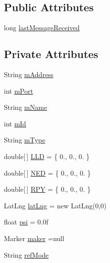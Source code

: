 \subsection*{Public Attributes}
\begin{DoxyCompactItemize}
\item 
long \hyperlink{classpt_1_1lsts_1_1asa_1_1sys_1_1Sys_ac6b2954f1dadd92dd574ae9c6af2a2e5}{last\+Message\+Received}
\end{DoxyCompactItemize}
\subsection*{Private Attributes}
\begin{DoxyCompactItemize}
\item 
String \hyperlink{classpt_1_1lsts_1_1asa_1_1sys_1_1Sys_adc306cc2f9bdf3006383c7612c5125c6}{m\+Address}
\item 
int \hyperlink{classpt_1_1lsts_1_1asa_1_1sys_1_1Sys_a35506036a8dbc58d09d0eea04e425698}{m\+Port}
\item 
String \hyperlink{classpt_1_1lsts_1_1asa_1_1sys_1_1Sys_a027640f2299a0769350254ebe9ccb1bd}{m\+Name}
\item 
int \hyperlink{classpt_1_1lsts_1_1asa_1_1sys_1_1Sys_ad0bd9feb2771224b99c8fcfb39f1baac}{m\+Id}
\item 
String \hyperlink{classpt_1_1lsts_1_1asa_1_1sys_1_1Sys_a3d26aacb60b4bcd95b5afdd8960206d3}{m\+Type}
\item 
double\mbox{[}$\,$\mbox{]} \hyperlink{classpt_1_1lsts_1_1asa_1_1sys_1_1Sys_a7b0e04954a2efba7989aba9124b2cd40}{L\+L\+D} = \{ 0., 0., 0. \}
\item 
double\mbox{[}$\,$\mbox{]} \hyperlink{classpt_1_1lsts_1_1asa_1_1sys_1_1Sys_a8a7eb29a9dfdc5a62012b81859932847}{N\+E\+D} = \{ 0., 0., 0. \}
\item 
double\mbox{[}$\,$\mbox{]} \hyperlink{classpt_1_1lsts_1_1asa_1_1sys_1_1Sys_a89e85c508c7aa491c390961763b0666e}{R\+P\+Y} = \{ 0., 0., 0. \}
\item 
Lat\+Lng \hyperlink{classpt_1_1lsts_1_1asa_1_1sys_1_1Sys_af1aaba346d090fae8aabf5c809245fd2}{lat\+Lng} = new Lat\+Lng(0,0)
\item 
float \hyperlink{classpt_1_1lsts_1_1asa_1_1sys_1_1Sys_a23d5b791a79a3e5b8863d35ee9dd21c7}{psi} = 0.\+0f
\item 
Marker \hyperlink{classpt_1_1lsts_1_1asa_1_1sys_1_1Sys_adae0c402ab1bf93eef2e5cd7b7acafe4}{maker} =null
\item 
String \hyperlink{classpt_1_1lsts_1_1asa_1_1sys_1_1Sys_aefcbaa46921015c924311d0a2d3dbbe0}{ref\+Mode}
\end{DoxyCompactItemize}


